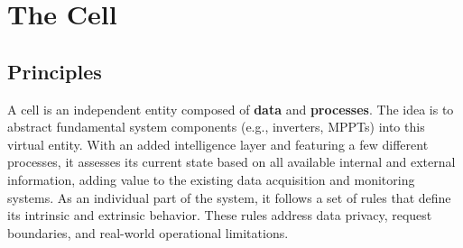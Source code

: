 









\section{The Cell} \label{sec:thecell}


\subsection{Principles}

A cell is an independent entity composed of \textbf{data} and \textbf{processes}. The idea is to abstract fundamental system components (e.g., inverters, MPPTs) into this virtual entity. With an added intelligence layer and featuring a few different processes, it assesses its current state based on all available internal and external information, adding value to the existing data acquisition and monitoring systems. As an individual part of the system, it follows a set of rules that define its intrinsic and extrinsic behavior. These rules address data privacy, request boundaries, and real-world operational limitations.

